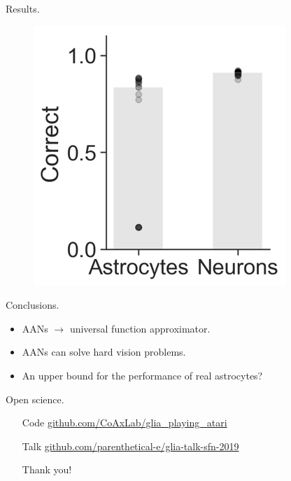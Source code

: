 \documentclass[10pt]{beamer}
\begin{document}
\begin{frame}[fragile]{Results.}
\begin{figure}
    \centering
    \includegraphics[scale=0.5]{images/results.png} 
\end{figure}
\end{frame}

\begin{frame}[fragile]{Conclusions.}
\begin{itemize}
\item AANs $\rightarrow$ universal function approximator.
\item AANs can solve hard vision problems.
\item An \alert{upper bound} for the performance of real astrocytes? 
\end{itemize}
\end{frame}

\begin{frame}[fragile]{Open science.}
\begin{itemize}
\item[Code] \url{github.com/CoAxLab/glia_playing_atari}
\item[Talk] \url{github.com/parenthetical-e/glia-talk-sfn-2019}
\item[] 
\item[] \alert{Thank you!}
\end{itemize}
\end{frame}


%   
%   

\end{document}
